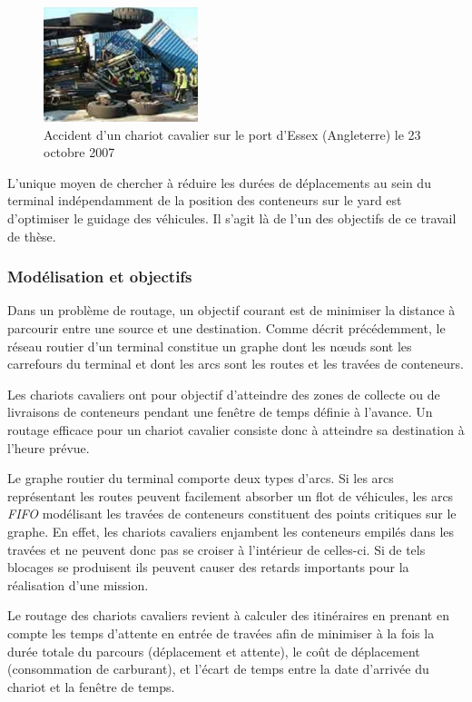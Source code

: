 \begin{figure}[ht]
 \begin{center}
 \includegraphics[width=0.4\textwidth]{chapitres/application/sc_crash.jpg}
 \caption{Accident d'un chariot cavalier sur le port d'Essex (Angleterre) le 23 octobre 2007}
 \label{fig:optTerminaux:scCrash}
 \end{center}
\end{figure}

L'unique moyen de chercher à réduire les durées de déplacements au sein du terminal indépendamment de la position des conteneurs sur le yard est d'optimiser le guidage des véhicules. Il s'agit là de l'un des objectifs de ce travail de thèse.

\subsubsection{Modélisation et objectifs}
Dans un problème de routage, un objectif courant est de minimiser la distance à parcourir entre une source et une destination. 
Comme décrit précédemment, le réseau routier d'un terminal constitue un graphe dont les n\oe{}uds sont les carrefours du terminal et dont les arcs sont les routes et les travées de conteneurs. 

Les chariots cavaliers ont pour objectif d'atteindre des zones de collecte ou de livraisons de conteneurs pendant une fenêtre de temps définie à l'avance. Un routage efficace pour un chariot cavalier consiste donc à atteindre sa destination à l'heure prévue.

Le graphe routier du terminal comporte deux types d'arcs. Si les arcs représentant les routes peuvent facilement absorber un flot de véhicules, les arcs \textit{FIFO} modélisant les travées de conteneurs constituent des points critiques sur le graphe. 
En effet, les chariots cavaliers enjambent les conteneurs empilés dans les travées et ne peuvent donc pas se croiser à l'intérieur de celles-ci. 
Si de tels blocages se produisent ils peuvent causer des retards importants pour la réalisation d'une mission.

Le routage des chariots cavaliers revient à calculer des itinéraires en prenant en compte les temps d'attente en entrée de travées afin de minimiser à la fois la durée totale du parcours (déplacement et attente), le coût de déplacement (consommation de carburant), et l'écart de temps entre la date d'arrivée du chariot et la fenêtre de temps.

